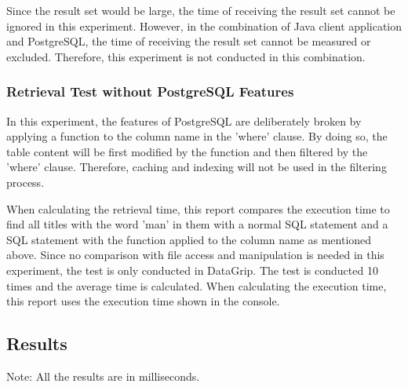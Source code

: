 \documentclass[a4paper,12pt]{article}
\begin{document}
Since the result set would be large, the time of receiving the result set cannot be ignored in this experiment.
However, in the combination of Java client application and PostgreSQL, the time of receiving the result set cannot be measured or excluded.
Therefore, this experiment is not conducted in this combination.

\subsubsection{Retrieval Test without PostgreSQL Features}
In this experiment, the features of PostgreSQL are deliberately broken by applying a function to the column name in the 'where' clause.
By doing so, the table content will be first modified by the function and then filtered by the 'where' clause.
Therefore, caching and indexing will not be used in the filtering process.

When calculating the retrieval time, this report compares the execution time to find all titles with the word 'man' in them with a normal SQL statement and a SQL statement with the function applied to the column name as mentioned above.
Since no comparison with file access and manipulation is needed in this experiment, the test is only conducted in DataGrip.
The test is conducted 10 times and the average time is calculated.
When calculating the execution time, this report uses the execution time shown in the console.
\subsection{Results}

\noindent
Note: All the results are in milliseconds.
\end{document}

